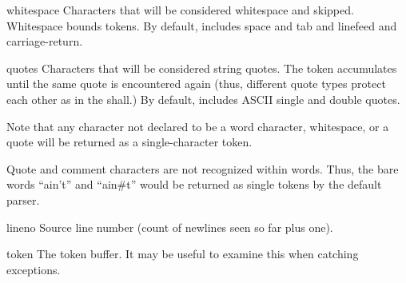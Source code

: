 \begin{memberdesc}{whitespace}
Characters that will be considered whitespace and skipped.  Whitespace
bounds tokens.  By default, includes space and tab and linefeed and
carriage-return.
\end{memberdesc}

\begin{memberdesc}{quotes}
Characters that will be considered string quotes.  The token
accumulates until the same quote is encountered again (thus, different
quote types protect each other as in the shall.)  By default, includes
ASCII single and double quotes.
\end{memberdesc}

Note that any character not declared to be a word character,
whitespace, or a quote will be returned as a single-character token.

Quote and comment characters are not recognized within words.  Thus,
the bare words ``ain't'' and ``ain#t'' would be returned as single
tokens by the default parser.

\begin{memberdesc}{lineno}
Source line number (count of newlines seen so far plus one).
\end{memberdesc}

\begin{memberdesc}{token}
The token buffer.  It may be useful to examine this when catching exceptions.
\end{memberdesc}

